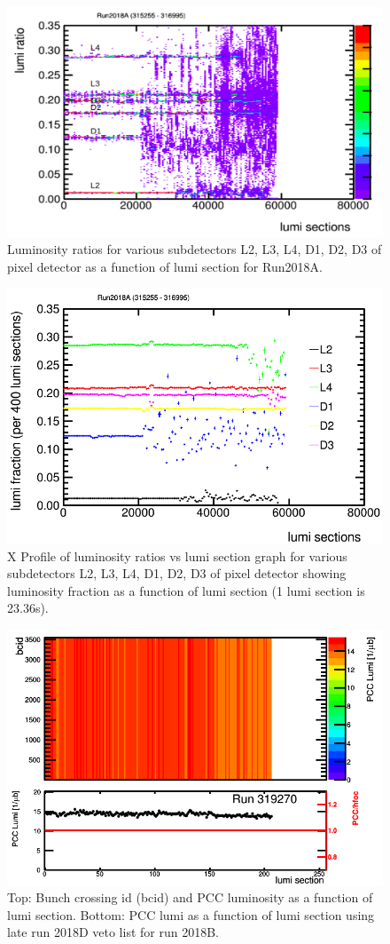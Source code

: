 \begin{figure}[H]
  \centering
  \includegraphics[width=0.52\columnwidth]{./2018A_lumiratio.png}
  \caption{Luminosity ratios for various subdetectors L2, L3, L4, D1, D2, D3 of pixel detector as a function of lumi section for Run2018A.}
  \label{fig:CMS}
\end{figure}



\begin{figure}[H]
  \centering
  \includegraphics[width=0.52\columnwidth]{./ProfileXcombined_new.png}
  \caption{X Profile of luminosity ratios vs lumi section graph for various subdetectors L2, L3, L4, D1, D2, D3 of pixel detector showing luminosity fraction as a function of lumi section (1 lumi section is 23.36s).}
  \label{fig:CMS}
\end{figure}





\begin{figure}[H]
  \centering
  \includegraphics[width=0.52\columnwidth]{./319270.png}
  \caption{Top: Bunch crossing id (bcid) and PCC luminosity as a function of lumi section. Bottom: PCC lumi as a function of lumi section using late run 2018D veto list for run 2018B.}
  \label{fig:CMS}
\end{figure}



